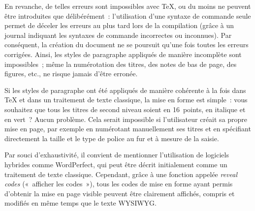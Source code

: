 \documentclass[11pt,a4paper,ngerman,french,DIV=8]{scrartcl}
\begin{document}
En revanche, de telles erreurs sont impossibles avec \TeX{}, ou du moins ne peuvent être introduites que délibérément : l’utilisation d’une syntaxe de commande seule permet de déceler les erreurs au plus tard lors de la compilation (grâce à un journal indiquant les syntaxes de commande incorrectes ou inconnues). Par conséquent, la création du document ne se poursuit qu’une fois toutes les erreurs corrigées. Ainsi, les styles de paragraphe appliqués de manière incomplète sont impossibles ; même la numérotation des titres, des notes de bas de page, des figures, etc., ne risque jamais d’être erronée.

Si les styles de paragraphe ont été appliqués de manière cohérente à la fois dans \TeX{} et dans un traitement de texte classique, la mise en forme est simple : vous souhaitez que tous les titres de second niveau soient en 16 points, en italique et en vert ? Aucun problème. Cela serait impossible si l’utilisateur créait sa propre mise en page, par exemple en numérotant manuellement ses titres et en spécifiant directement la taille et le type de police au fur et à mesure de la saisie.

Par souci d'exhaustivité, il convient de mentionner l'utilisation de logiciels hybrides comme WordPerfect, qui peut être décrit initialement comme un traitement de texte classique. Cependant, grâce à une fonction appelée \emph{reveal codes} (« afficher les codes »), tous les codes de mise en forme ayant permis d'obtenir la mise en page visible peuvent être clairement affichés, compris et modifiés en même temps que le texte WYSIWYG.
\end{document}
